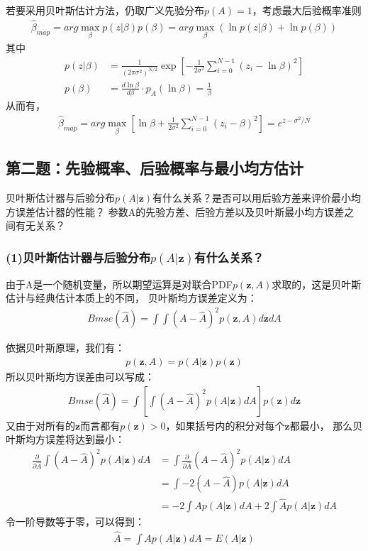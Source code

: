 \documentclass[fontset=windows]{article}
\numberwithin{figure}{section}
\begin{document}
若要采用贝叶斯估计方法，仍取广义先验分布\(p(A)=1\)，考虑最大后验概率准则
\begin{align*}
	\hat{\beta}_{map}=arg\underset{\beta}{\max}p(z|\beta)p(\beta)=arg\underset{\beta}{\max}(\ln p(z|\beta)+\ln p(\beta))
\end{align*}
其中
\begin{align*}
	p(z|\beta)
	 & =\frac{1}{(2\pi \sigma^2)^{N/2}}
	\exp\left[-\frac{1}{2\sigma^2}\sum_{i=0}^{N-1}(z_i-\ln\beta)^2\right] \\
	p(\beta)
	 & =\frac{d\ln\beta}{d\beta}\cdot p_A(\ln \beta)=\frac{1}{\beta}
\end{align*}
从而有，
\begin{align*}
	\hat{\beta}_{map}=arg\underset{\beta}{\max}\left[\ln\beta+
		\frac{1}{2\sigma^2}\sum_{i=0}^{N-1}(z_i-\beta)^2\right]
	=e^{\overline{z}-\sigma^2/N}
\end{align*}

\subsection{第二题：先验概率、后验概率与最小均方估计}
贝叶斯估计器与后验分布\(p(A|\mathbf{z})\)有什么关系？是否可以用后验方差来评价最小均方误差估计器的性能？
参数A的先验方差、后验方差以及贝叶斯最小均方误差之间有无关系？

\subsubsection*{(1)贝叶斯估计器与后验分布\(p(A|\mathbf{z})\)有什么关系？}
由于A是一个随机变量，所以期望运算是对联合PDF\(p(\mathbf{z},A)\)求取的，这是贝叶斯估计与经典估计本质上的不同，
贝叶斯均方误差定义为：
\begin{align*}
	Bmse(\hat{A})=\int\int(A-\hat{A})^2 p(\mathbf{z},A)d\mathbf{z}dA
\end{align*}

依据贝叶斯原理，我们有：
\begin{align*}
	p(\mathbf{z},A)=p(A|\mathbf{z})p(\mathbf{z})
\end{align*}
所以贝叶斯均方误差由可以写成：
\begin{align*}
	Bmse(\hat{A})=\int \left[\int (A-\hat{A})^2 p(A|\mathbf{z})dA\right]p(\mathbf{z})d\mathbf{z}
\end{align*}
又由于对所有的\(\mathbf{z}\)而言都有\(p(\mathbf{z})>0\)，如果括号内的积分对每个\(\mathbf{z}\)都最小，
那么贝叶斯均方误差将达到最小：
\begin{align*}
	\frac{\partial}{\partial \hat{A}}\int (A-\hat{A})^2 p(A|\mathbf{z})dA
	 & =\int \frac{\partial}{\partial \hat{A}}(A-\hat{A})^2 p(A|\mathbf{z})dA \\
	 & =\int -2(A-\hat{A})p(A|\mathbf{z})dA                                   \\
	 & =-2\int Ap(A|\mathbf{z})dA+2\int \hat{A}p(A|\mathbf{z})dA
\end{align*}
令一阶导数等于零，可以得到：
\begin{align*}
	\hat{A}=\int Ap(A|\mathbf{z})dA=E(A|\mathbf{z})
\end{align*}
\end{document}
